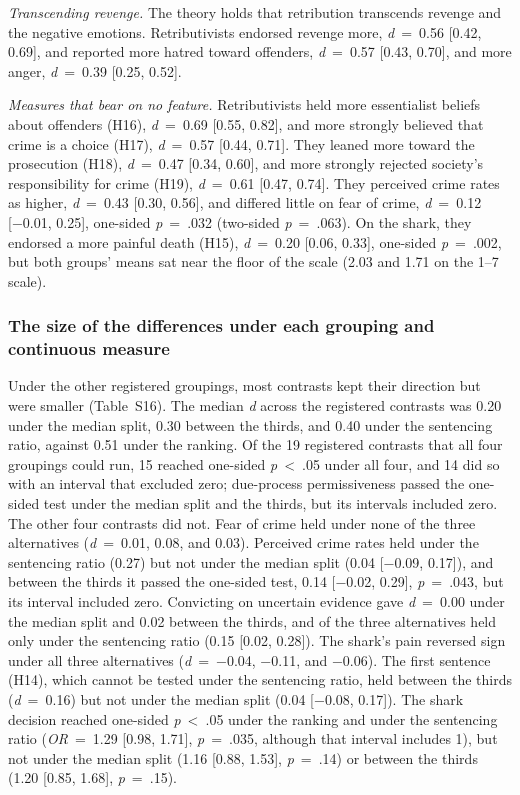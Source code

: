 \emph{Transcending revenge.} The theory holds that retribution transcends revenge and the negative emotions. Retributivists endorsed revenge more, \emph{d}~=~0.56 {[}0.42, 0.69{]}, and reported more hatred toward offenders, \emph{d}~=~0.57 {[}0.43, 0.70{]}, and more anger, \emph{d}~=~0.39 {[}0.25, 0.52{]}.

\emph{Measures that bear on no feature.} Retributivists held more essentialist beliefs about offenders (H16), \emph{d}~=~0.69 {[}0.55, 0.82{]}, and more strongly believed that crime is a choice (H17), \emph{d}~=~0.57 {[}0.44, 0.71{]}. They leaned more toward the prosecution (H18), \emph{d}~=~0.47 {[}0.34, 0.60{]}, and more strongly rejected society's responsibility for crime (H19), \emph{d}~=~0.61 {[}0.47, 0.74{]}. They perceived crime rates as higher, \emph{d}~=~0.43 {[}0.30, 0.56{]}, and differed little on fear of crime, \emph{d}~=~0.12 {[}−0.01, 0.25{]}, one-sided \emph{p}~=~.032 (two-sided \emph{p}~=~.063). On the shark, they endorsed a more painful death (H15), \emph{d}~=~0.20 {[}0.06, 0.33{]}, one-sided \emph{p}~=~.002, but both groups' means sat near the floor of the scale (2.03 and 1.71 on the 1--7 scale).

\subsubsection{The size of the differences under each grouping and continuous measure}\label{the-size-of-the-differences-under-each-grouping-and-continuous-measure}

Under the other registered groupings, most contrasts kept their direction but were smaller (Table~S16). The median \emph{d} across the registered contrasts was 0.20 under the median split, 0.30 between the thirds, and 0.40 under the sentencing ratio, against 0.51 under the ranking. Of the 19 registered contrasts that all four groupings could run, 15 reached one-sided \emph{p}~\textless{}~.05 under all four, and 14 did so with an interval that excluded zero; due-process permissiveness passed the one-sided test under the median split and the thirds, but its intervals included zero. The other four contrasts did not. Fear of crime held under none of the three alternatives (\emph{d}~=~0.01, 0.08, and 0.03). Perceived crime rates held under the sentencing ratio (0.27) but not under the median split (0.04 {[}−0.09, 0.17{]}), and between the thirds it passed the one-sided test, 0.14 {[}−0.02, 0.29{]}, \emph{p}~=~.043, but its interval included zero. Convicting on uncertain evidence gave \emph{d}~=~0.00 under the median split and 0.02 between the thirds, and of the three alternatives held only under the sentencing ratio (0.15 {[}0.02, 0.28{]}). The shark's pain reversed sign under all three alternatives (\emph{d}~=~−0.04, −0.11, and −0.06). The first sentence (H14), which cannot be tested under the sentencing ratio, held between the thirds (\emph{d}~=~0.16) but not under the median split (0.04 {[}−0.08, 0.17{]}). The shark decision reached one-sided \emph{p}~\textless{}~.05 under the ranking and under the sentencing ratio (\emph{OR}~=~1.29 {[}0.98, 1.71{]}, \emph{p}~=~.035, although that interval includes 1), but not under the median split (1.16 {[}0.88, 1.53{]}, \emph{p}~=~.14) or between the thirds (1.20 {[}0.85, 1.68{]}, \emph{p}~=~.15).

